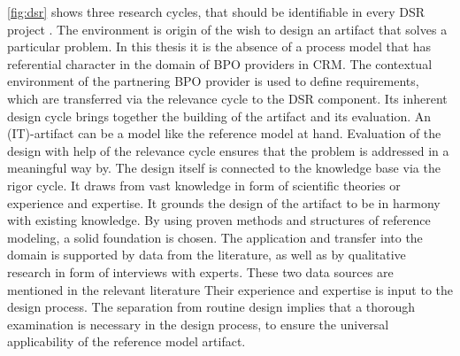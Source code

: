\Fig \ref{fig:dsr} shows three research cycles, that should be identifiable in every \acrshort{DSR} project \citep{Hevner2010}. The environment is origin of the wish to design an artifact that solves a particular problem. In this thesis it is the absence of a process model that has referential character in the domain of \acrshort{BPO} providers in \acrshort{CRM}. The contextual environment of the partnering  \acrshort{BPO} provider is used to define requirements, which are transferred via the relevance cycle to the \acrshort{DSR} component. Its inherent design cycle brings together the building of the artifact and its evaluation. An (IT)-artifact can be a model \citep{Hevner2010} like the reference model at hand. Evaluation of the design with help of the relevance cycle ensures that the problem is addressed in a meaningful way by. The design itself is connected to the knowledge base via the rigor cycle. It draws from vast knowledge in form of scientific theories or experience and expertise. It grounds the design of the artifact to be in harmony with existing knowledge. By using proven methods and structures of reference modeling, a solid foundation is chosen. The application and transfer into the domain is supported by data from the literature, as well as by qualitative research in form of interviews with experts. These two data sources are mentioned in the relevant literature \citep[]{thomas2006mang} Their experience and expertise is input to the design process. The separation from routine design implies that a thorough examination is necessary in the design process, to ensure the universal applicability of the reference model artifact. 




